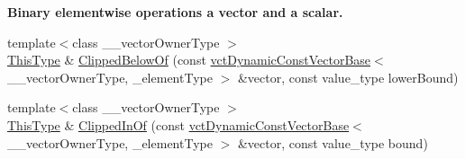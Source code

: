 \begin{Indent}{\bf Binary elementwise operations a vector and a scalar.}
\begin{DoxyCompactItemize}
\item 
{\footnotesize template$<$class \-\_\-\-\_\-vector\-Owner\-Type $>$ }\\\hyperlink{classvct_dynamic_const_vector_base_a39da273523717f678f54d3321ebca3dd}{This\-Type} \& \hyperlink{classvct_dynamic_vector_base_adc04ce9cda9d9c7535f625cb114b334a}{Clipped\-Below\-Of} (const \hyperlink{classvct_dynamic_const_vector_base}{vct\-Dynamic\-Const\-Vector\-Base}$<$ \-\_\-\-\_\-vector\-Owner\-Type, \-\_\-element\-Type $>$ \&vector, const value\-\_\-type lower\-Bound)
\item 
{\footnotesize template$<$class \-\_\-\-\_\-vector\-Owner\-Type $>$ }\\\hyperlink{classvct_dynamic_const_vector_base_a39da273523717f678f54d3321ebca3dd}{This\-Type} \& \hyperlink{classvct_dynamic_vector_base_a2a41f6dd284eee6ee782a554fd7ab54b}{Clipped\-In\-Of} (const \hyperlink{classvct_dynamic_const_vector_base}{vct\-Dynamic\-Const\-Vector\-Base}$<$ \-\_\-\-\_\-vector\-Owner\-Type, \-\_\-element\-Type $>$ \&vector, const value\-\_\-type bound)
\end{DoxyCompactItemize}
\end{Indent}
